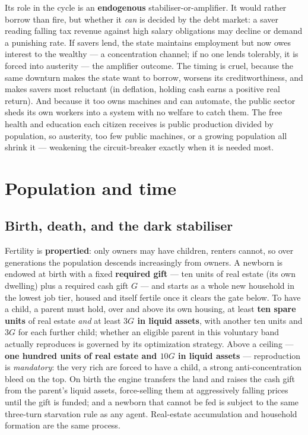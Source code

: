 \documentclass[11pt]{article}
\begin{document}
Its role in the cycle is an \textbf{endogenous} stabiliser-or-amplifier. It
would rather borrow than fire, but whether it \emph{can} is decided by the debt
market: a saver reading falling tax revenue against high salary obligations may
decline or demand a punishing rate. If savers lend, the state maintains
employment but now owes interest to the wealthy --- a concentration channel; if
no one lends tolerably, it is forced into austerity --- the amplifier outcome.
The timing is cruel, because the same downturn makes the state want to borrow,
worsens its creditworthiness, and makes savers most reluctant (in deflation,
holding cash earns a positive real return). And because it too owns machines and
can automate, the public sector sheds its own workers into a system with no
welfare to catch them. The free health and education each citizen receives is
public production divided by population, so austerity, too few public machines,
or a growing population all shrink it --- weakening the circuit-breaker exactly
when it is needed most.

\section{Population and time}

\subsection{Birth, death, and the dark stabiliser}
\label{sec:birthdeath}

Fertility is \textbf{propertied}: only owners may have children, renters cannot,
so over generations the population descends increasingly from owners. A newborn
is endowed at birth with a fixed \textbf{required gift} --- ten units of real
estate (its own dwelling) plus a required cash gift $G$ --- and starts as a whole
new household in the lowest job tier, housed and itself fertile once it clears the
gate below. To have a child, a parent must hold, over and above its own housing,
at least \textbf{ten spare units} of real estate \emph{and} at least \textbf{$3G$
in liquid assets}, with another ten units and $3G$ for each further child;
whether an eligible parent in this voluntary band actually reproduces is governed
by its optimization strategy. Above a ceiling --- \textbf{one hundred units of
real estate and $10G$ in liquid assets} --- reproduction is \emph{mandatory}: the
very rich are forced to have a child, a strong anti-concentration bleed on the
top. On birth the engine transfers the land and raises the cash gift from the
parent's liquid assets, force-selling them at aggressively falling prices until
the gift is funded; and a newborn that cannot be fed is subject to the same
three-turn starvation rule as any agent. Real-estate accumulation and household
formation are the same process.
\end{document}
